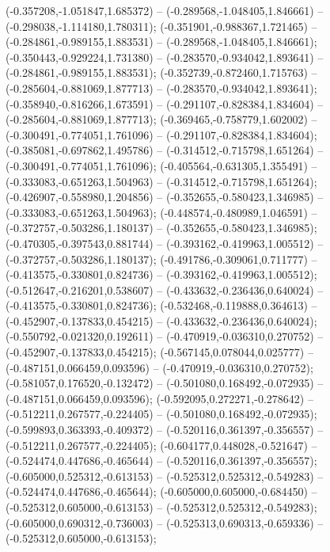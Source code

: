  (-0.357208,-1.051847,1.685372) -- (-0.289568,-1.048405,1.846661) -- (-0.298038,-1.114180,1.780311);
 (-0.351901,-0.988367,1.721465) -- (-0.284861,-0.989155,1.883531) -- (-0.289568,-1.048405,1.846661);
 (-0.350443,-0.929224,1.731380) -- (-0.283570,-0.934042,1.893641) -- (-0.284861,-0.989155,1.883531);
 (-0.352739,-0.872460,1.715763) -- (-0.285604,-0.881069,1.877713) -- (-0.283570,-0.934042,1.893641);
 (-0.358940,-0.816266,1.673591) -- (-0.291107,-0.828384,1.834604) -- (-0.285604,-0.881069,1.877713);
 (-0.369465,-0.758779,1.602002) -- (-0.300491,-0.774051,1.761096) -- (-0.291107,-0.828384,1.834604);
 (-0.385081,-0.697862,1.495786) -- (-0.314512,-0.715798,1.651264) -- (-0.300491,-0.774051,1.761096);
 (-0.405564,-0.631305,1.355491) -- (-0.333083,-0.651263,1.504963) -- (-0.314512,-0.715798,1.651264);
 (-0.426907,-0.558980,1.204856) -- (-0.352655,-0.580423,1.346985) -- (-0.333083,-0.651263,1.504963);
 (-0.448574,-0.480989,1.046591) -- (-0.372757,-0.503286,1.180137) -- (-0.352655,-0.580423,1.346985);
 (-0.470305,-0.397543,0.881744) -- (-0.393162,-0.419963,1.005512) -- (-0.372757,-0.503286,1.180137);
 (-0.491786,-0.309061,0.711777) -- (-0.413575,-0.330801,0.824736) -- (-0.393162,-0.419963,1.005512);
 (-0.512647,-0.216201,0.538607) -- (-0.433632,-0.236436,0.640024) -- (-0.413575,-0.330801,0.824736);
 (-0.532468,-0.119888,0.364613) -- (-0.452907,-0.137833,0.454215) -- (-0.433632,-0.236436,0.640024);
 (-0.550792,-0.021320,0.192611) -- (-0.470919,-0.036310,0.270752) -- (-0.452907,-0.137833,0.454215);
 (-0.567145,0.078044,0.025777) -- (-0.487151,0.066459,0.093596) -- (-0.470919,-0.036310,0.270752);
 (-0.581057,0.176520,-0.132472) -- (-0.501080,0.168492,-0.072935) -- (-0.487151,0.066459,0.093596);
 (-0.592095,0.272271,-0.278642) -- (-0.512211,0.267577,-0.224405) -- (-0.501080,0.168492,-0.072935);
 (-0.599893,0.363393,-0.409372) -- (-0.520116,0.361397,-0.356557) -- (-0.512211,0.267577,-0.224405);
 (-0.604177,0.448028,-0.521647) -- (-0.524474,0.447686,-0.465644) -- (-0.520116,0.361397,-0.356557);
 (-0.605000,0.525312,-0.613153) -- (-0.525312,0.525312,-0.549283) -- (-0.524474,0.447686,-0.465644);
 (-0.605000,0.605000,-0.684450) -- (-0.525312,0.605000,-0.613153) -- (-0.525312,0.525312,-0.549283);
 (-0.605000,0.690312,-0.736003) -- (-0.525313,0.690313,-0.659336) -- (-0.525312,0.605000,-0.613153);
